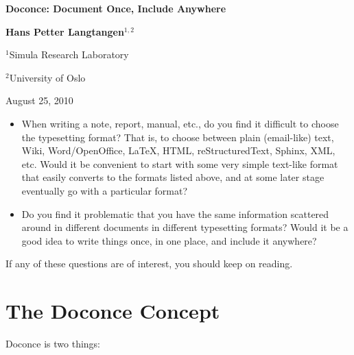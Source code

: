 \documentclass{article}
\begin{document}
\begin{center}
{\LARGE\bf Doconce: Document Once, Include Anywhere}
\end{center}



\begin{center}
{\bf Hans Petter Langtangen${}^{1, 2}$} \\ [0mm]
\end{center}

\begin{center}
{\small ${}^1$Simula Research Laboratory} \\ [-1.0mm]
\end{center}

\begin{center}
{\small ${}^2$University of Oslo} \\ [-1.0mm]
\end{center}





\begin{center}
August 25, 2010
\end{center}



\begin{itemize}
 \item When writing a note, report, manual, etc., do you find it difficult
   to choose the typesetting format? That is, to choose between plain
   (email-like) text, Wiki, Word/OpenOffice, {\LaTeX}, HTML,
   reStructuredText, Sphinx, XML, etc.  Would it be convenient to
   start with some very simple text-like format that easily converts
   to the formats listed above, and at some later stage eventually go
   with a particular format?
 \item Do you find it problematic that you have the same information
   scattered around in different documents in different typesetting
   formats? Would it be a good idea to write things once, in one
   place, and include it anywhere?
\end{itemize}
If any of these questions are of interest, you should keep on reading.


\section{The Doconce Concept}

Doconce is two things:
\end{document}
